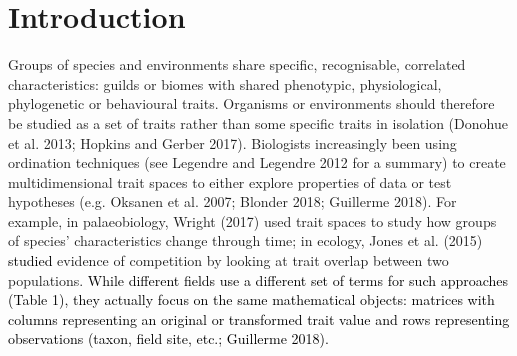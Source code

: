 \documentclass[]{article}
\begin{document}
\section{Introduction}\label{introduction}

Groups of species and environments share specific, recognisable,
correlated characteristics: guilds or biomes with shared phenotypic,
physiological, phylogenetic or behavioural traits. Organisms or
environments should therefore be studied as a set of traits rather than
some specific traits in isolation (Donohue et al. 2013; Hopkins and
Gerber 2017). Biologists increasingly been using ordination techniques
(see Legendre and Legendre 2012 for a summary) to create
multidimensional trait spaces to either explore properties of data or
test hypotheses (e.g. Oksanen et al. 2007; Blonder 2018; Guillerme
2018). For example, in palaeobiology, Wright (2017) used trait spaces to
study how groups of species' characteristics change through time; in
ecology, Jones et al. (2015) \textcolor{black}{ studied
} evidence of competition by looking at trait overlap between two
populations. \textcolor{black}{ While different fields
use a different set of terms for such approaches (Table 1), they
actually focus on the same mathematical objects: matrices with columns
representing an original or transformed trait value and rows
representing observations (taxon, field site, etc.; Guillerme 2018). }

\renewcommand\baselinestretch{1}\selectfont
\end{document}
